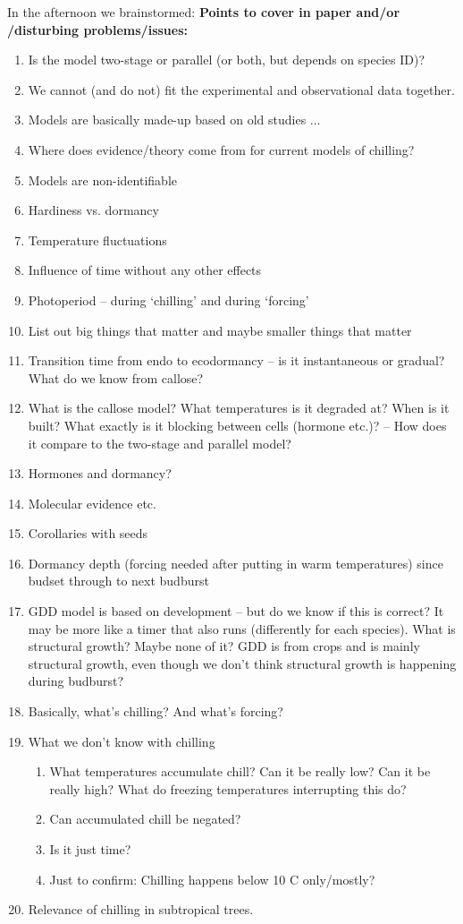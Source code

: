 \documentclass[11pt,letter]{article}
\begin{document}
In the afternoon we brainstormed: {\bf Points to cover in paper and/or /disturbing problems/issues:}

\begin{enumerate}
\item Is the model two-stage or parallel (or both, but depends on species ID)?
\item We cannot (and do not) fit the experimental and observational data together.
\item Models are basically made-up based on old studies ...
\item Where does evidence/theory come from for current models of chilling?
\item Models are non-identifiable
\item Hardiness vs. dormancy
\item Temperature fluctuations
\item Influence of time without any other effects
\item Photoperiod -- during `chilling' and during `forcing'
\item List out big things that matter and maybe smaller things that matter
\item Transition time from endo to ecodormancy -- is it instantaneous or gradual? What do we know from callose?
\item What is the callose model? What temperatures is it degraded at? When is it built? What exactly is it blocking between cells (hormone etc.)? -- How does it compare to the two-stage and parallel model?
\item Hormones and dormancy?
\item Molecular evidence etc.
\item Corollaries with seeds
\item Dormancy depth (forcing needed after putting in warm temperatures) since budset through to next budburst
\item GDD model is based on development -- but do we know if this is correct? It may be more like a timer that also runs (differently for each species). What is structural growth? Maybe none of it? GDD is from crops and is mainly structural growth, even though we don't think structural growth is happening during budburst? 
\item Basically, what's chilling? And what's forcing? 
\item What we don't know with chilling
\begin{enumerate}
\item What temperatures accumulate chill? Can it be really low? Can it be really high? What do freezing temperatures interrupting this do?
\item Can accumulated chill be negated?
\item Is it just time?
\item Just to confirm: Chilling happens below 10 C only/mostly?
\end{enumerate}
\item Relevance of chilling in subtropical trees. 
\end{enumerate}
\end{document}
